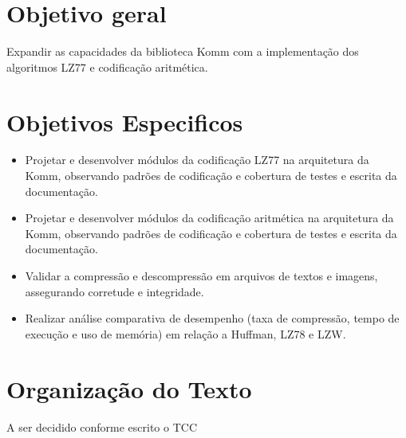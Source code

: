 \section{Objetivo geral}
Expandir as capacidades da biblioteca Komm com a implementação dos algoritmos LZ77 e codificação aritmética.

\section{Objetivos Especificos}
\begin{itemize}
    \item  Projetar e desenvolver módulos da codificação LZ77 na arquitetura da Komm, observando padrões de codificação e cobertura de testes e escrita da documentação.
   
    \item  Projetar e desenvolver módulos da codificação aritmética na arquitetura da Komm, observando padrões de codificação e cobertura de testes e escrita da documentação.
        
    \item Validar a compressão e descompressão em arquivos de textos e imagens, assegurando corretude e integridade.
    
    \item Realizar análise comparativa de desempenho (taxa de compressão, tempo de execução e uso de memória) em relação a Huffman, LZ78 e LZW.

\end{itemize}
\section{Organização do Texto}
A ser decidido conforme escrito o TCC